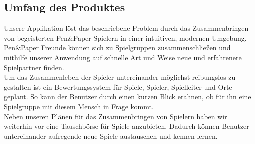 \documentclass[DIV=13, 10pt,a4paper]{scrartcl}
\begin{document}
	\subsection*{Umfang des Produktes}
	Unsere Applikation löst das beschriebene Problem durch das Zusammenbringen von begeisterten Pen\&Paper Spielern in einer intuitiven, modernen Umgebung. Pen\&Paper Freunde können sich zu Spielgruppen zusammenschließen und mithilfe unserer Anwendung auf schnelle Art und Weise neue und erfahrenere Spielpartner finden.\\
	Um das Zusammenleben der Spieler untereinander möglichst reibungslos zu gestalten ist ein Bewertungssystem für Spiele, Spieler, Spielleiter und Orte geplant. So kann der Benutzer durch einen kurzen Blick erahnen, ob für ihn eine Spielgruppe mit diesem Mensch in Frage kommt.\\
	Neben unseren Plänen für das Zusammenbringen von Spielern haben wir weiterhin vor eine Tauschbörse für Spiele anzubieten. Dadurch können Benutzer untereinander aufregende neue Spiele austauschen und kennen lernen.
	
\end{document}
